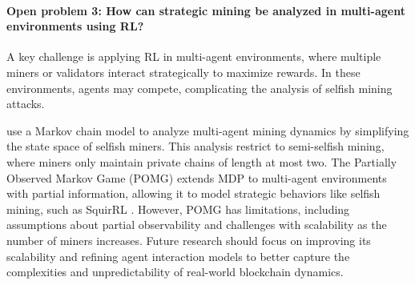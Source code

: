 \paragraph{Open problem 3: How can strategic mining be analyzed in multi-agent environments using RL?}
A key challenge is applying RL in multi-agent environments, where multiple miners or validators interact strategically to maximize rewards. In these environments, agents may compete, complicating the analysis of selfish mining attacks. 

\cite{marmolejo2019competing} use a Markov chain model to analyze multi-agent mining dynamics by simplifying the state space of selfish miners. This analysis restrict to semi-selfish mining, where miners only maintain private chains of length at most two. 
The Partially Observed Markov Game (POMG) extends MDP to multi-agent environments with partial information, allowing it to model strategic behaviors like selfish mining, such as SquirRL \cite{hou2019squirrl}. 
However, POMG has limitations, including assumptions about partial observability and challenges with scalability as the number of miners increases. Future research should focus on improving its scalability and refining agent interaction models to better capture the complexities and unpredictability of real-world blockchain dynamics.